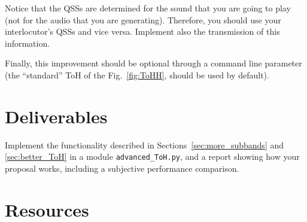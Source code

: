 Notice that the QSSs are determined for the sound that you are going
to play (not for the audio that you are generating). Therefore, you
should use your interlocutor's QSSs and vice versa. Implement also the
transmission of this information.

Finally, this improvement should be optional through a command line
parameter (the ``standard'' ToH of the Fig.~\ref{fig:ToHH}, should be
used by default).



\begin{comment}
\subsection{Subjective performance}

\begin{enumerate}
\item Using a recording tool such as
  \href{http://audacity.sourceforge.net}{Audacity} or
  \href{http://plugin.org.uk/timemachine/}{JACK Timemachine}, record
  the simulated transmission of a piece of audio and create a
  \texttt{.wav} file, when the audio has been transmitted using
  \texttt{temporal\_overlapped\_DWT\_coding.py} and
  \texttt{threshold.py}, using in both cases the same transmission
  bit-rate. Vary the quantization step size for controlling the
  bit-rate.
\item Determine which audio sounds better from a subjective point of
  view. Repeat this step the number of times you consider necessary.
\end{enumerate}
\end{comment}

\section{Deliverables}

Implement the functionality described in
Sections~\ref{sec:more_subbands} and \ref{sec:better_ToH} in a module
\verb|advanced_ToH.py|, and a report showing how your proposal works,
including a subjective performance comparison.

\section{Resources}



